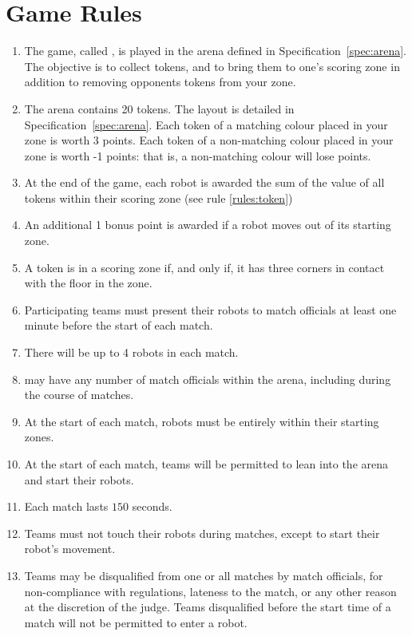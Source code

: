 \section{Game Rules}
\label{sec:rules}

\begin{enumerate}
  \item The game, called \emph{\gamename}, is played in the arena defined in
        Specification~\ref{spec:arena}. The objective is to collect tokens, and
        to bring them to one's scoring zone in addition to removing opponents
        tokens from your zone.
  \item The arena contains 20 tokens. The layout is detailed in
        Specification~\ref{spec:arena}. Each token of a matching colour placed
        in your zone is worth 3 points. Each token of a non-matching colour
        placed in your zone is worth -1 points: that is, a non-matching colour
        will lose points.
  \item At the end of the game, each robot is awarded the sum of the value of
        all tokens within their scoring zone (see rule \ref{rules:token})
  \item An additional 1 bonus point is awarded if a robot moves out of its
        starting zone.
  \item \label{rules:token}A token is in a scoring zone if, and only if, it
        has three corners in contact with the floor in the zone.
  \item Participating teams must present their robots to match officials at
        least one minute before the start of each match.
  \item There will be up to 4 robots in each match.
  \item \org may have any number of match officials within the arena, including
        during the course of matches.
  \item At the start of each match, robots must be entirely within their
        starting zones.
  \item At the start of each match, teams will be permitted to lean into the
        arena and start their robots.
  \item Each match lasts $150$ seconds.
  \item Teams must not touch their robots during matches, except to start their
        robot's movement.
  \item Teams may be disqualified from one or all matches by match officials,
        for non-compliance with regulations, lateness to the match, or any other
        reason at the discretion of the judge. Teams disqualified before the
        start time of a match will not be permitted to enter a robot.
\end{enumerate}
